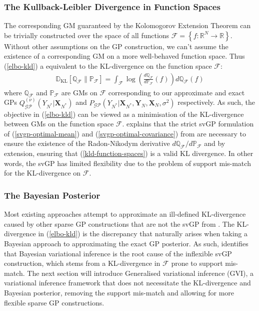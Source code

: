 \documentclass{article}
\newcommand{\KLD}{\operatorname{\mathbb{D}_{KL}}}
\newcommand{\GP}{\operatorname{\mathcal{GP}}}
\numberwithin{equation}{section}
\begin{document}
\subsubsection{The Kullback-Leibler Divergence in Function Spaces}
The corresponding GM guaranteed by the Kolomogorov Extension Theorem can be trivially constructed over the space of all functions $\mathcal{F} = \left\{f: \mathbb{R}^{N} \rightarrow \mathbb{R} \right\}$. Without other assumptions on the GP construction, we can't assume the existence of a corresponding GM on a more well-behaved function space. Thus (\ref{elbo-kld}) a equivalent to the KL-divergence on the function space $\mathcal{F}$:
\begin{align}
    \KLD\left[ \mathbb{Q}_\mathcal{F} \| \mathbb{P}_\mathcal{F} \right] = \int_{\mathcal{F}} \log \left( \frac{d \mathbb{Q}_\mathcal{F}}{d \mathbb{P}_\mathcal{F}} (f)\right)d \mathbb{Q}_\mathcal{F}(f)
    \label{kld-function-spaces}
\end{align}
where $\mathbb{Q}_\mathcal{F}$ and $\mathbb{P}_\mathcal{F}$ are GMs on $\mathcal{F}$ corresponding to our approximate and exact GPs $Q_{\GP}^{(\nu)}\left(Y_{N^*} \vert \mathbf{X}_{N^*}\right) $ and $P_{\GP}\left(Y_{N^*} \vert \mathbf{X}_{N^*}, \mathbf{Y}_N, \mathbf{X}_N, \sigma^2 \right)$ respectively. As such, the objective in (\ref{elbo-kld}) can be viewed as a minimisation of the KL-divergence between GMs on the function space $\mathcal{F}$. \cite{matthews2016sparse} explains that the strict svGP formulation of (\ref{svgp-optimal-mean}) and (\ref{svgp-optimal-covariance}) from \cite{titsias2009variational} are necessary to ensure the existence of the Radon-Nikodym derivative $d \mathbb{Q}_\mathcal{F}/d \mathbb{P}_\mathcal{F}$ and by extension, ensuring that (\ref{kld-function-spaces}) is a valid KL divergence. In other words, the svGP has limited flexibility due to the problem of support mis-match for the KL-divergence on $\mathcal{F}$.

\subsubsection{The Bayesian Posterior}
Most existing approaches attempt to approximate an ill-defined KL-divergence caused by other sparse GP constructions that are not the svGP from \cite{titsias2009variational}. The KL-divergence in (\ref{elbo-kld}) is the discrepancy that naturally arises when taking a Bayesian approach to approximating the exact GP posterior. As such, \cite{wild2022generalized} identifies that Bayesian variational inference is the root cause of the inflexible svGP construction, which stems from a KL-divergence in $\mathcal{F}$ prone to support mis-match. The next section will introduce Generalised variational inference (GVI), a variational inference framework that does not necessitate the KL-divergence and Bayesian posterior, removing the support mis-match and allowing for more flexible sparse GP constructions.
\end{document}
